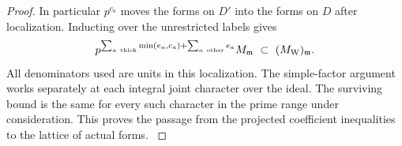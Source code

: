 \begin{proof}
In particular \(p^{c_a}\) moves
the forms on \(D'\) into the forms on \(D\) after localization.
Inducting over the unrestricted labels gives
\[
 p^{\sum_{a\ {\rm thick}}\min(e_a,c_a)+
       \sum_{a\ {\rm other}}e_a}
            M_{\mathfrak m}\ \subset\ (M_{\rm W})_{\mathfrak m}.
\]
All denominators used are units in this localization.
The simple-factor argument works separately at each integral
joint character over the ideal. The surviving bound is the
same for every such character in the prime range under
consideration. This proves the passage from the projected
coefficient inequalities to the lattice of actual forms.
\label{cor:lift-graded-inclusion-1}
\end{proof}

